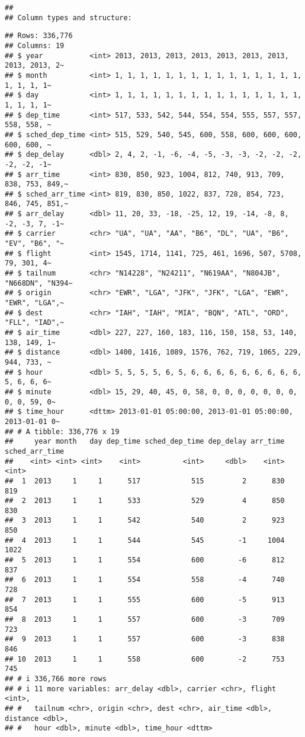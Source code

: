 \documentclass[
]{article}
\begin{document}
\begin{verbatim}
## 
## Column types and structure:
\end{verbatim}

\begin{verbatim}
## Rows: 336,776
## Columns: 19
## $ year           <int> 2013, 2013, 2013, 2013, 2013, 2013, 2013, 2013, 2013, 2~
## $ month          <int> 1, 1, 1, 1, 1, 1, 1, 1, 1, 1, 1, 1, 1, 1, 1, 1, 1, 1, 1~
## $ day            <int> 1, 1, 1, 1, 1, 1, 1, 1, 1, 1, 1, 1, 1, 1, 1, 1, 1, 1, 1~
## $ dep_time       <int> 517, 533, 542, 544, 554, 554, 555, 557, 557, 558, 558, ~
## $ sched_dep_time <int> 515, 529, 540, 545, 600, 558, 600, 600, 600, 600, 600, ~
## $ dep_delay      <dbl> 2, 4, 2, -1, -6, -4, -5, -3, -3, -2, -2, -2, -2, -2, -1~
## $ arr_time       <int> 830, 850, 923, 1004, 812, 740, 913, 709, 838, 753, 849,~
## $ sched_arr_time <int> 819, 830, 850, 1022, 837, 728, 854, 723, 846, 745, 851,~
## $ arr_delay      <dbl> 11, 20, 33, -18, -25, 12, 19, -14, -8, 8, -2, -3, 7, -1~
## $ carrier        <chr> "UA", "UA", "AA", "B6", "DL", "UA", "B6", "EV", "B6", "~
## $ flight         <int> 1545, 1714, 1141, 725, 461, 1696, 507, 5708, 79, 301, 4~
## $ tailnum        <chr> "N14228", "N24211", "N619AA", "N804JB", "N668DN", "N394~
## $ origin         <chr> "EWR", "LGA", "JFK", "JFK", "LGA", "EWR", "EWR", "LGA",~
## $ dest           <chr> "IAH", "IAH", "MIA", "BQN", "ATL", "ORD", "FLL", "IAD",~
## $ air_time       <dbl> 227, 227, 160, 183, 116, 150, 158, 53, 140, 138, 149, 1~
## $ distance       <dbl> 1400, 1416, 1089, 1576, 762, 719, 1065, 229, 944, 733, ~
## $ hour           <dbl> 5, 5, 5, 5, 6, 5, 6, 6, 6, 6, 6, 6, 6, 6, 6, 5, 6, 6, 6~
## $ minute         <dbl> 15, 29, 40, 45, 0, 58, 0, 0, 0, 0, 0, 0, 0, 0, 0, 59, 0~
## $ time_hour      <dttm> 2013-01-01 05:00:00, 2013-01-01 05:00:00, 2013-01-01 0~
## # A tibble: 336,776 x 19
##     year month   day dep_time sched_dep_time dep_delay arr_time sched_arr_time
##    <int> <int> <int>    <int>          <int>     <dbl>    <int>          <int>
##  1  2013     1     1      517            515         2      830            819
##  2  2013     1     1      533            529         4      850            830
##  3  2013     1     1      542            540         2      923            850
##  4  2013     1     1      544            545        -1     1004           1022
##  5  2013     1     1      554            600        -6      812            837
##  6  2013     1     1      554            558        -4      740            728
##  7  2013     1     1      555            600        -5      913            854
##  8  2013     1     1      557            600        -3      709            723
##  9  2013     1     1      557            600        -3      838            846
## 10  2013     1     1      558            600        -2      753            745
## # i 336,766 more rows
## # i 11 more variables: arr_delay <dbl>, carrier <chr>, flight <int>,
## #   tailnum <chr>, origin <chr>, dest <chr>, air_time <dbl>, distance <dbl>,
## #   hour <dbl>, minute <dbl>, time_hour <dttm>
\end{verbatim}
\end{document}
